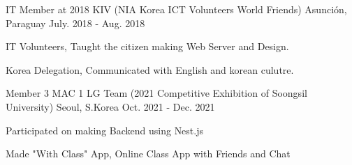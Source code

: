 

\begin{cventries}

  \cventry
    {IT Member at 2018} %
    {KIV (NIA Korea ICT Volunteers World Friends)} %
    {Asunción, Paraguay} %
    {July. 2018 - Aug. 2018} %
    {
      \begin{cvitems} %
        \item {IT Volunteers, Taught the citizen making Web Server and Design.}
        \item {Korea Delegation, Communicated with English and korean culutre.}
      \end{cvitems}
    }

  \cventry
    {Member} %
    {3 MAC 1 LG Team (2021 Competitive Exhibition of Soongsil University)} %
    {Seoul, S.Korea} %
    {Oct. 2021 - Dec. 2021} %
    {
      \begin{cvitems} %
        \item {Participated on making Backend using Nest.js}
        \item {Made "With Class" App, Online Class App with Friends and Chat}
      \end{cvitems}
    }

\end{cventries}
